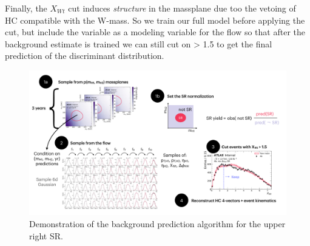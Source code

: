 Finally, the $X_{Wt}$ cut induces \emph{structure} in the massplane due too the vetoing of HC compatible with the W-mass. So we train our full model before applying the \Xwt cut, but include the \Xwt variable as a modeling variable for the flow so that after the background estimate is trained we can still cut on \Xwt > 1.5 to get the final prediction of the discriminant distribution. 


\begin{figure}[hbt]
    \centering
    \includegraphics[width=\textwidth]{figures//flows/interp-graphic.pdf} 
    \caption{
    		 Demonstration of the background prediction algorithm for the upper right SR. 
		 }
		 \label{fig:interp-graphic-\valreg}
\end{figure}



